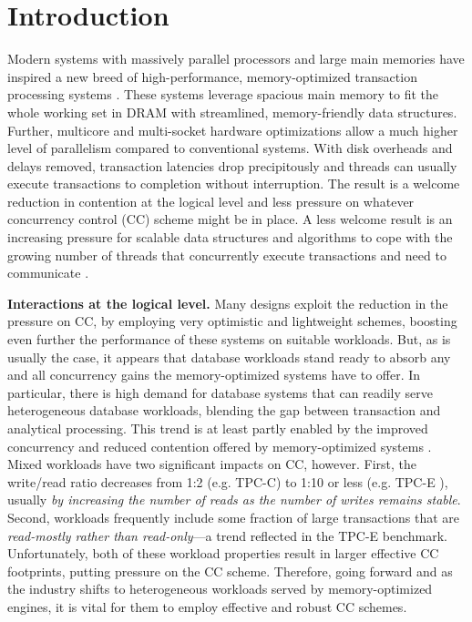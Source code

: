 
\section{Introduction}

Modern systems with massively parallel processors and large main memories have inspired a new breed of high-performance, memory-optimized transaction processing systems \cite{Kallman+08,PandisJHA10,KemperN11,LarsonBDFPZ11,LevandoskiLSSW15,TuZKLM13}. These systems leverage spacious main memory to fit the whole working set in DRAM with streamlined, memory-friendly data structures. Further, multicore and multi-socket hardware optimizations allow a much higher level of parallelism compared to conventional systems. With disk overheads and delays removed, transaction latencies drop precipitously and threads can usually execute transactions to completion without interruption. The result is a welcome reduction in contention at the logical level and less pressure on whatever concurrency control (CC) scheme might be in place. A less welcome result is an increasing pressure for scalable data structures and algorithms to cope with the growing number of threads that concurrently execute transactions and need to communicate \cite{JohnsonPA13}.


\vspace{2mm}
{\bf Interactions at the logical level.} 
Many designs exploit the reduction in the pressure on CC, by employing very optimistic and lightweight schemes, boosting even further the performance of these systems on suitable workloads.
But, as is usually the case, it appears that database workloads stand ready to absorb any and all concurrency gains the memory-optimized systems have to offer. In particular, there is high demand for database systems that can readily serve heterogeneous database workloads, blending the gap between transaction and analytical processing. This trend is at least partly enabled by the improved concurrency and reduced contention offered by memory-optimized systems \cite{Farber+12}. Mixed workloads have two significant impacts on CC, however. First, the write/read ratio decreases from 1:2 (e.g. TPC-C) to 1:10 or less (e.g. TPC-E \cite{Chen+10,TozunPKJA13}), usually {\it by increasing the number of reads as the number of writes remains stable}.
Second, workloads frequently include some fraction of large transactions that are {\it read-mostly rather than read-only}---a trend reflected in the TPC-E benchmark. Unfortunately, both of these workload properties result in larger effective CC footprints, putting pressure on the CC scheme. 
Therefore, going forward and as the industry shifts to heterogeneous workloads served by memory-optimized engines, it is vital for them to employ effective and robust CC schemes. 


